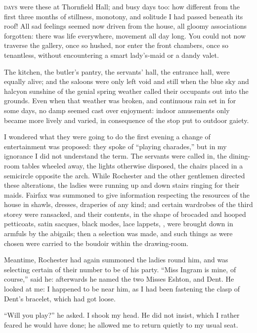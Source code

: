 
 \textsc{days} were these at Thornfield Hall; and busy days too: how
different from the first three months of stillness, monotony, and
solitude I had passed beneath its roof! All sad feelings seemed now
driven from the house, all gloomy associations forgotten: there was life
everywhere, movement all day long. You could not now traverse the
gallery, once so hushed, nor enter the front chambers, once so
tenantless, without encountering a smart lady's-maid or a dandy valet.

The kitchen, the butler's pantry, the servants' hall, the entrance hall,
were equally alive; and the saloons were only left void and still when
the blue sky and halcyon sunshine of the genial spring weather called
their occupants out into the grounds. Even when that weather was
broken, and continuous rain set in for some days, no damp seemed cast
over enjoyment: indoor amusements only became more lively and varied, in
consequence of the stop put to outdoor gaiety.

I wondered what they were going to do the first evening a change of
entertainment was proposed: they spoke of \enquote{playing charades,}
but in my ignorance I did not understand the term. The servants were
called in, the dining-room tables wheeled away, the lights otherwise
disposed, the chairs placed in a semicircle opposite the arch. While
\Mr{} Rochester and the other gentlemen directed these alterations, the
ladies were running up and down stairs ringing for their maids. \Mrs{}
Fairfax was summoned to give information respecting the resources of the
house in shawls, dresses, draperies of any kind; and certain wardrobes
of the third storey were ransacked, and their contents, in the shape of
brocaded and hooped petticoats, satin sacques, black modes, lace
lappets, \etc, were brought down in armfuls by the abigails; then a
selection was made, and such things as were chosen were carried to the
boudoir within the drawing-room.

Meantime, \Mr{} Rochester had again summoned the ladies round him, and was
selecting certain of their number to be of his party. \enquote{Miss
Ingram is mine, of course,} said he: afterwards he named the two Misses
Eshton, and \Mrs{} Dent. He looked at me: I happened to be near him, as I
had been fastening the clasp of \Mrs{} Dent's bracelet, which had got
loose.

\enquote{Will you play?} he asked. I shook my head. He did not insist,
which I rather feared he would have done; he allowed me to return
quietly to my usual seat.


